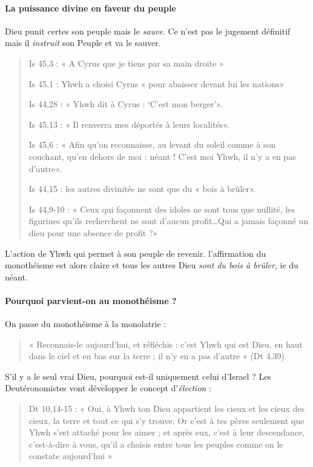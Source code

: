 \paragraph{La puissance divine en faveur du peuple} Dieu punit certes son peuple mais le \textit{sauve}. Ce n'est pas le jugement définitif mais il \textit{instruit} son Peuple et va le sauver.

\begin{quote}
    Is 45,3 : « A Cyrus que je tiens par sa main droite »
    
Is 45,1 : Yhwh a choisi Cyrus « pour abaisser devant lui les nations»

Is 44,28 : « Yhwh dit à Cyrus : ‘C’est mon berger’».

Is 45,13 : « Il renverra mes déportés à leurs localités».

Is 45,6 : « Afin qu’on reconnaisse, au levant du soleil comme à son couchant, qu’en dehors de moi :
néant ! C’est moi Yhwh, il n’y a en pas d’autre».

Is 44,15 : les autres divinités ne sont que du « bois à brûler».

Is 44,9-10 : « Ceux qui façonnent des idoles ne sont tous que nullité, les figurines qu’ils recherchent
ne sont d’aucun profit…Qui a jamais façonné un dieu pour une absence de profit ?»
\end{quote}

L'action de Yhwh qui permet à son peuple de revenir. l'affirmation du monothéisme est alors claire et tous les autres Dieu \textit{sont du bois à brûler}, ie du néant.


\paragraph{Pourquoi parvient-on au monothéisme ?} On passe du monothéisme à la monolatrie : 
\begin{quote}
    « Reconnais-le aujourd’hui, et réfléchis : c’est Yhwh qui est Dieu, en haut dans le ciel et en bas sur la
terre ; il n’y en a pas d’autre » (Dt 4,39).
\end{quote}

S'il y a le seul vrai Dieu, pourquoi est-il uniquement celui d'Israel ? Les Deutéronomistes vont développer le concept d'\textit{élection} :

\begin{quote}
Dt 10,14-15 : « Oui, à Yhwh ton Dieu appartient les cieux et les cieux des cieux, la terre et tout ce qui
s’y trouve. Or c’est à tes pères seulement que Yhwh s’est attaché pour les aimer ; et après eux, c’est à
leur descendance, c’est-à-dire à vous, qu’il a choisis entre tous les peuples comme on le constate
aujourd’hui »
\end{quote}

